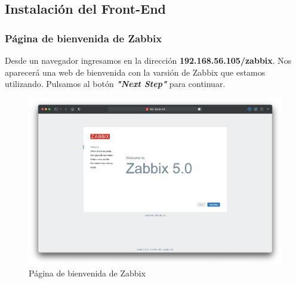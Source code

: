 \subsection{Instalación del Front-End}
    \subsubsection{Página de bienvenida de Zabbix}
    Desde un navegador ingresamos en la dirección \textbf{192.168.56.105/zabbix}. Nos aparecerá una web de bienvenida con la varsión de Zabbix que estamos utilizando. 
    Pulsamos al botón \textbf{\emph{"Next Step"}} para continuar.
    \begin{figure}[H]
        \centering
        \includegraphics[scale=0.25]{images/zabbix_installation_1.png}
        \caption{Página de bienvenida de Zabbix}
        \label{fig:zabbix_installation_1}
    \end{figure}

